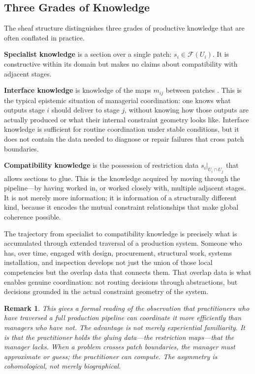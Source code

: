 \documentclass[12pt]{article}
\newtheorem{remark}{Remark}
\begin{document}
\subsection{Three Grades of Knowledge}

The sheaf structure distinguishes three grades of productive knowledge that are often conflated in practice.

\textbf{Specialist knowledge} is a section over a single patch: $s_i \in \mathcal{F}(U_i)$. It is constructive within its domain but makes no claims about compatibility with adjacent stages.

\textbf{Interface knowledge} is knowledge of the maps $m_{ij}$ between patches \cite{Graeber2018}. This is the typical epistemic situation of managerial coordination: one knows what outputs stage $i$ should deliver to stage $j$, without knowing how those outputs are actually produced or what their internal constraint geometry looks like. Interface knowledge is sufficient for routine coordination under stable conditions, but it does not contain the data needed to diagnose or repair failures that cross patch boundaries.

\textbf{Compatibility knowledge} is the possession of restriction data $s_i|_{U_i \cap U_j}$ that allows sections to glue. This is the knowledge acquired by moving through the pipeline---by having worked in, or worked closely with, multiple adjacent stages. It is not merely more information; it is information of a structurally different kind, because it encodes the mutual constraint relationships that make global coherence possible.

The trajectory from specialist to compatibility knowledge is precisely what is accumulated through extended traversal of a production system. Someone who has, over time, engaged with design, procurement, structural work, systems installation, and inspection develops not just the union of those local competencies but the overlap data that connects them. That overlap data is what enables genuine coordination: not routing decisions through abstractions, but decisions grounded in the actual constraint geometry of the system.

\begin{remark}
This gives a formal reading of the observation that practitioners who have traversed a full production pipeline can coordinate it more efficiently than managers who have not. The advantage is not merely experiential familiarity. It is that the practitioner holds the gluing data---the restriction maps---that the manager lacks. When a problem crosses patch boundaries, the manager must approximate or guess; the practitioner can compute. The asymmetry is cohomological, not merely biographical.
\end{remark}
\end{document}
